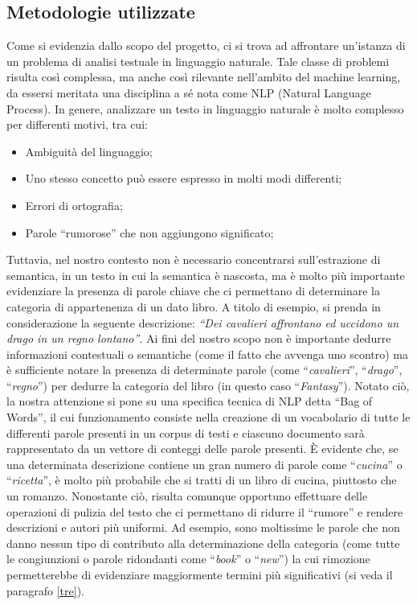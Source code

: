 \documentclass[12pt,oneside]{article}
\begin{document}
\begin{enumerate}
\subsection{Metodologie utilizzate}\label{due}
    \begin{justify}
        Come si evidenzia dallo scopo del progetto, ci si trova ad affrontare un’istanza di un problema di analisi testuale in linguaggio naturale. Tale classe di problemi risulta così complessa, ma anche così rilevante nell’ambito del machine learning, da essersi meritata una disciplina a sé nota come NLP (Natural Language Process). In genere, analizzare un testo in linguaggio naturale è molto complesso per differenti motivi, tra cui:
        \begin{itemize}
            \item Ambiguità del linguaggio;
            \item Uno stesso concetto può essere espresso in molti modi differenti;
            \item Errori di ortografia;
            \item Parole “rumorose” che non aggiungono significato;
        \end{itemize}
        Tuttavia, nel nostro contesto non è necessario concentrarsi sull’estrazione di semantica, in un testo in cui la semantica è nascosta, ma è molto più importante evidenziare la presenza di parole chiave che ci permettano di determinare la categoria di appartenenza di un dato libro. 
        A titolo di esempio, si prenda in considerazione la seguente descrizione: 
        \textit{“Dei cavalieri affrontano ed uccidono un drago in un regno lontano”}.
        Ai fini del nostro scopo non è importante dedurre informazioni contestuali o semantiche (come il fatto che avvenga uno scontro) ma è sufficiente notare la presenza di determinate parole (come “\textit{cavalieri}”, “\textit{drago}”, “\textit{regno}”) per dedurre la categoria del libro (in questo caso “\textit{Fantasy}”).
        Notato ciò, la nostra attenzione si pone su una specifica tecnica di NLP detta “Bag of Words”, il cui funzionamento consiste nella creazione di un vocabolario di tutte le differenti parole presenti in un corpus di testi e ciascuno documento sarà rappresentato da un vettore di conteggi delle parole presenti. È evidente che, se una determinata descrizione contiene un gran numero di parole come “\textit{cucina}” o “\textit{ricetta}”, è molto più probabile che si tratti di un libro di cucina, piuttosto che un romanzo.
        Nonostante ciò, risulta comunque opportuno effettuare delle operazioni di pulizia del testo che ci permettano di ridurre il “rumore” e rendere descrizioni e autori più uniformi. Ad esempio, sono moltissime le parole che non danno nessun tipo di contributo alla determinazione della categoria (come tutte le congiunzioni o parole ridondanti come “\textit{book}” o “\textit{new}”) la cui rimozione permetterebbe di evidenziare maggiormente termini più significativi (si veda il paragrafo \ref{tre}).

    \end{justify}
\end{enumerate}
\end{document}
